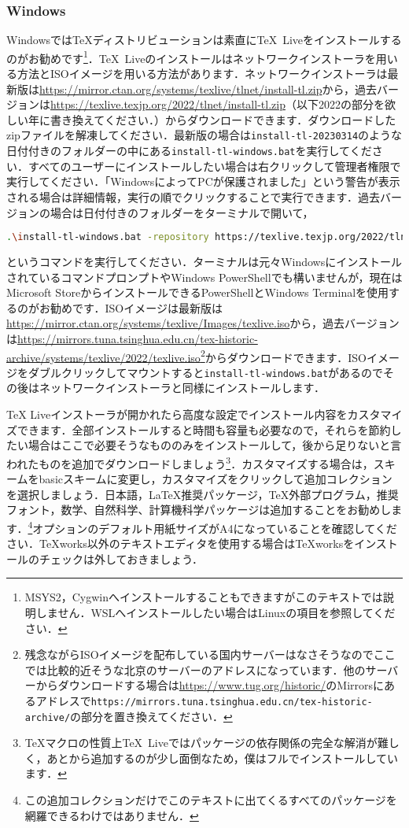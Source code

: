 \subsubsection*{Windows}
Windowsでは\TeX ディストリビューションは素直に\TeX\ Liveをインストールするのがお勧めです\footnote{MSYS2，Cygwinへインストールすることもできますがこのテキストでは説明しません．WSLへインストールしたい場合はLinuxの項目を参照してください．}．\TeX\ Liveのインストールはネットワークインストーラを用いる方法とISOイメージを用いる方法があります．ネットワークインストーラは最新版は\url{https://mirror.ctan.org/systems/texlive/tlnet/install-tl.zip}から，過去バージョンは\url{https://texlive.texjp.org/2022/tlnet/install-tl.zip}（以下2022の部分を欲しい年に書き換えてください．）からダウンロードできます．ダウンロードしたzipファイルを解凍してください．最新版の場合は\texttt{install-tl-20230314}のような日付付きのフォルダーの中にある\texttt{install-tl-windows.bat}を実行してください．すべてのユーザーにインストールしたい場合は右クリックして管理者権限で実行してください．「WindowsによってPCが保護されました」という警告が表示される場合は詳細情報，実行の順でクリックすることで実行できます．過去バージョンの場合は日付付きのフォルダーをターミナルで開いて，
\begin{lstlisting}[language=bash]
.\install-tl-windows.bat -repository https://texlive.texjp.org/2022/tlnet/
\end{lstlisting}
というコマンドを実行してください．ターミナルは元々WindowsにインストールされているコマンドプロンプトやWindows PowerShellでも構いませんが，現在はMicrosoft StoreからインストールできるPowerShellとWindows Terminalを使用するのがお勧めです．ISOイメージは最新版は\url{https://mirror.ctan.org/systems/texlive/Images/texlive.iso}から，過去バージョンは\url{https://mirrors.tuna.tsinghua.edu.cn/tex-historic-archive/systems/texlive/2022/texlive.iso}\footnote{残念ながらISOイメージを配布している国内サーバーはなさそうなのでここでは比較的近そうな北京のサーバーのアドレスになっています．他のサーバーからダウンロードする場合は\url{https://www.tug.org/historic/}のMirrorsにあるアドレスで\texttt{https://mirrors.tuna.tsinghua.edu.cn/tex-historic-archive/}の部分を置き換えてください．}からダウンロードできます．ISOイメージをダブルクリックしてマウントすると\texttt{install-tl-windows.bat}があるのでその後はネットワークインストーラと同様にインストールします．

TeX Liveインストーラが開かれたら高度な設定でインストール内容をカスタマイズできます．全部インストールすると時間も容量も必要なので，それらを節約したい場合はここで必要そうなもののみをインストールして，後から足りないと言われたものを追加でダウンロードしましょう\footnote{\TeX マクロの性質上\TeX\ Liveではパッケージの依存関係の完全な解消が難しく，あとから追加するのが少し面倒なため，僕はフルでインストールしています．}．カスタマイズする場合は，スキームをbasicスキームに変更し，カスタマイズをクリックして追加コレクションを選択しましょう．日本語，LaTeX推奨パッケージ，TeX外部プログラム，推奨フォント，数学、自然科学、計算機科学パッケージは追加することをお勧めします．\footnote{この追加コレクションだけでこのテキストに出てくるすべてのパッケージを網羅できるわけではありません．}オプションのデフォルト用紙サイズがA4になっていることを確認してください．TeXworks以外のテキストエディタを使用する場合はTeXworksをインストールのチェックは外しておきましょう．


